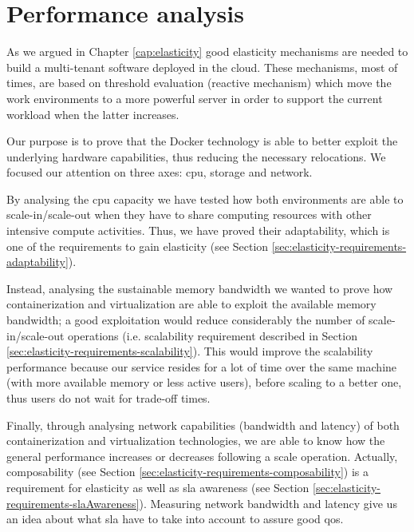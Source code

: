 %
%
\chapter{Performance analysis}
\label{cap:measurements}
As we argued in Chapter \ref{cap:elasticity} good elasticity mechanisms are needed to build a multi-tenant
software deployed in the cloud. These mechanisms, most of times, are based on threshold
evaluation (reactive mechanism) which move the work environments to a more powerful server in order
to support the current workload when the latter increases.

Our purpose is to prove that the Docker technology is able to better exploit the underlying hardware
capabilities, thus reducing the necessary relocations. We focused our attention on three axes: \acs{cpu},
storage and network.

By analysing the \acs{cpu} capacity we have tested how both environments are able to scale-in/scale-out
when they have to share computing resources with other intensive compute activities. Thus, we have proved
their adaptability, which is one of the requirements to gain elasticity (see Section 
\ref{sec:elasticity-requirements-adaptability}).

Instead, analysing the sustainable memory bandwidth we wanted to prove how containerization and virtualization
are able to exploit the available memory bandwidth; a good exploitation would reduce considerably the
number of scale-in/scale-out operations (i.e. scalability requirement described in Section 
\ref{sec:elasticity-requirements-scalability}). This would improve the scalability performance because
our service resides for a lot of time over the same machine (with more available memory or less active
users), before scaling to a better one, thus users do not wait for trade-off times.

Finally, through analysing network capabilities (bandwidth and latency) of both containerization and
virtualization technologies, we are able to know how the general performance increases or decreases
following a scale operation. Actually, composability (see Section 
\ref{sec:elasticity-requirements-composability}) is a requirement for elasticity as well as \ac{sla} 
awareness (see Section \ref{sec:elasticity-requirements-slaAwareness}). Measuring network bandwidth
and latency give us an idea about what \ac{sla} have to take into account to assure good \ac{qos}.

